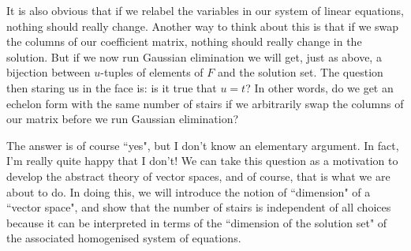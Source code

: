 \documentclass[11pt]{amsbook}
\theoremstyle{definition}
\begin{document}
It is also obvious that if we relabel the variables in our system of linear equations, nothing should really change. Another way to think about this is that if we swap the columns of our coefficient matrix, nothing should really change in the solution. But if we now run Gaussian elimination we will get, just as above,  a bijection between $u$-tuples of elements of $F$ and the solution set. The question then staring us in the face is: is it true that $u=t$? In other words, do we get an echelon form with the same number of stairs if we arbitrarily swap the columns of our matrix before we run Gaussian elimination?

The answer is of course ``yes", but I don't know an elementary argument. In fact, I'm really quite happy that I don't! We can take this question as a motivation to develop the abstract theory of vector spaces, and of course, that is what we are about to do. In doing this, we will introduce the notion of ``dimension" of a ``vector space", and show that the number of stairs is independent of all choices because it can be interpreted in terms of the ``dimension of the solution set" of the associated homogenised system of equations.
\end{document}
